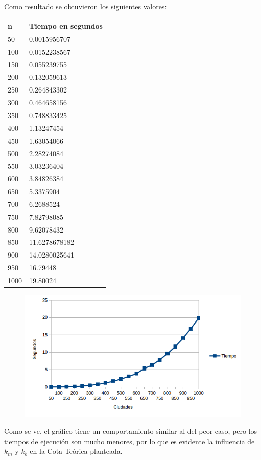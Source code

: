   Como resultado se obtuvieron los siguientes valores:
    \begin{table}[htb]
  \centering
  \begin{tabular}[c]{|l|l|}

		\hline
n & Tiempo en segundos\\
		\hline
50	&	0.0015956707\\
		\hline
100	&	0.0152238567\\
		\hline
150	&	0.055239755\\
		\hline
200	&	0.132059613\\
		\hline
250	&	0.264843302\\
		\hline
300	&	0.464658156\\
		\hline
350	&	0.748833425\\
		\hline
400	&	1.13247454\\
		\hline
450	&	1.63054066\\
		\hline
500	&	2.28274084\\
		\hline
550	&	3.03236404\\
		\hline
600	&	3.84826384\\
		\hline
650	&	5.3375904\\
		\hline
700	&	6.2688524\\
		\hline
750	&	7.82798085\\
		\hline
800	&	9.62078432\\
		\hline
850	&	11.6278678182\\
		\hline
900	&	14.0280025641\\
		\hline
950	&	16.79448\\
		\hline
1000	&	19.80024\\
		\hline

	\end{tabular}
	\end{table}
	
    \begin{figure}[h!]
   \begin{center}
	\includegraphics[scale=0.8]{imagenes/ej1/aleatorio1.png}
   \end{center}
  \end{figure}
    \newpage

  Como se ve, el gr\'afico tiene un comportamiento similar al del peor caso, pero los tiempos de ejecuci\'on son mucho menores, por lo que es evidente la influencia de $k_m$ y $k_b$ en la Cota Te\'orica planteada.
  